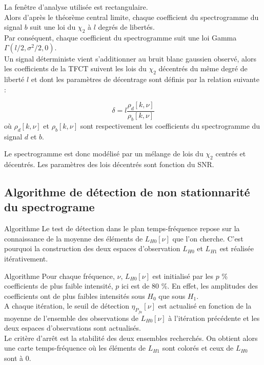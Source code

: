 \documentclass{beamer}
\begin{document}
\begin{frame}
La fenêtre d'analyse utilisée est rectangulaire.\\
Alors d'après le théorème central limite, chaque coefficient du spectrogramme du signal $b$ suit une loi du $\chi_2$ à $l$ degrés de libertés.\\
Par conséquent, chaque coefficient du spectrogramme suit une loi Gamma $\Gamma(l/2,\sigma^2/2,0).$ \\
\vspace{0.25cm}
Un signal déterministe vient s'additionner au bruit blanc gaussien observé, alors les coefficients de la TFCT suivent les lois du $\chi_2$ décentrés du même degré de liberté $l$ et dont les paramètres de décentrage sont définis par la relation suivante :

\begin{equation}
\delta = l \frac{\rho_d[k,\nu]}{\rho_b[k,\nu]}
\label{eq2}
\end{equation}
où $\rho_d[k,\nu]$ et $\rho_b[k,\nu]$ sont respectivement les coefficients du spectrogramme du signal $d$ et $b$.

Le spectrogramme est donc modélisé par un mélange de lois du $\chi_2$ centrés et décentrés. Les paramètres des lois décentrés sont fonction du SNR.
\end{frame}

\subsection{Algorithme de détection de non stationnarité du spectrograme}
\begin{frame}{Algorithme}
Le test de détection dans le plan temps-fréquence repose sur la connaissance de la moyenne des éléments de $L_{H0}[\nu]$ que l'on cherche. C'est pourquoi la construction des deux espaces d'observation $L_{H0}$ et $L_{H1}$ est réalisée itérativement. 
\end{frame}

\begin{frame}
\begin{block}{Algorithme}
Pour chaque fréquence, $\nu$, $L_{H0}[\nu]$ est initialisé par les $p$ \% coefficients de plus faible intensité, $p$ ici est de 80 \%. En effet, les amplitudes des coefficients ont de plus faibles intensités sous $H_0$ que sous $H_1$. \\
A chaque itération, le seuil de détection $\eta_{P_{fa}}[\nu]$ est actualisé en fonction de la moyenne de l'ensemble des observations de $L_{H0}[\nu]$ à l'itération précédente et les deux espaces d'observations sont actualisés. \\
Le critère d'arrêt est la stabilité des deux ensembles recherchés. On obtient alors une carte temps-fréquence où les éléments de $L_{H1}$ sont colorés et ceux de $L_{H0}$ sont à 0.
\end{block}
\end{frame}
\end{document}
